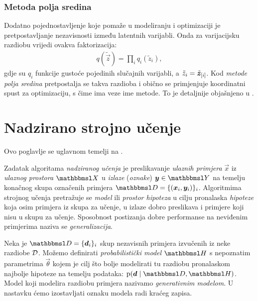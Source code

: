 \documentclass[utf8, diplomski, lmodern]{fer}
\begin{document}
\subsection{Metoda polja sredina}

Dodatno pojednostavljenje koje pomaže u modeliranju i optimizaciji je pretpostavljanje nezavisnosti između latentnih varijabli. Onda za varijacijsku razdiobu vrijedi ovakva faktorizacija:
\begin{align}
q(\tilde{\vec z}) = \prod_i q_i(\tilde{z}_i),
\end{align}
gdje su $q_i$ funkcije gustoće pojedinih slučajnih varijabli, a $\tilde{z}_i=\tilde{\vec z}_\ind{i}$. Kod \emph{metode polja sredina} pretpostalja se takva razdioba i obično se primjenjuje koordinatni spust za optimizaciju, s čime ima veze ime metode. To je detaljnije objašnjeno u \citet{Murphy:2012:MLPP}.

\iffalse
Neka je, radi kraćeg zapisa, $t(\tilde{\vec z}) \coloneqq \p(\rvec z=\tilde{\vec z},\rvec x=\vec x)$. Uz aproksimaciju polja sredina donja varijacijska granica postaje
\begin{align}
L_{\vec x}(\tilde{\rvec z}) 
&= \E_{\tilde{\rvec z}}\sbr{\ln t(\tilde{\vec z}) - \ln q(\tilde{\vec z})}
\\
&= \int\dif{\tilde{\vec z}} \del{\prod_i q_i(\tilde{z}_i)}\del{\ln t(\tilde{\vec z}) - \sum_j \ln q_j(\tilde{z}_j)}
\text{.}
\end{align}
\fi



\chapter{Nadzirano strojno učenje} \label{chap:nsu}

Ovo poglavlje se uglavnom temelji na \citet{Snajder:2014:SU,Goodfellow:2016:DL}.

Zadatak algoritama \emph{nadziranog učenja} je preslikavanje \emph{ulaznih primjera} $\vec x$ iz \emph{ulaznog prostora} $\set{X}$ u \emph{izlaze} (\emph{oznake}) $\vec y\in\set{Y}$ na temelju konačnog skupa označenih primjera $\set{D} = \cbr{\del{\vec x_i,\vec y_i}}_{i}$. Algoritmima strojnog učenja pretražuje se \emph{model} ili \emph{prostor hipoteza} u cilju pronalaska \emph{hipoteze} koja osim primjera iz skupa za učenje, u izlaze dobro preslikava i primjere koji nisu u skupu za učenje. Sposobnost postizanja dobre performanse na neviđenim primjerima naziva se \emph{generalizacija}.

Neka je $\set{D}=\cbr{\vec d_i}_i$ skup nezavisnih primjera izvučenih iz neke razdiobe $\mathcal{D}$. Možemo definirati \emph{probabilistički model} $\set H$ s nepoznatim parametrima $\vec\theta$ kojem je cilj što bolje modelirati tu razdiobu pronalaskom najbolje hipoteze na temelju podataka: $\p(\vec{d}\mid\set{D},\set H)$. Model koji modelira razdiobu primjera nazivamo \emph{generativnim modelom}. U nastavku ćemo izostavljati oznaku modela radi kraćeg zapisa.
\end{document}
